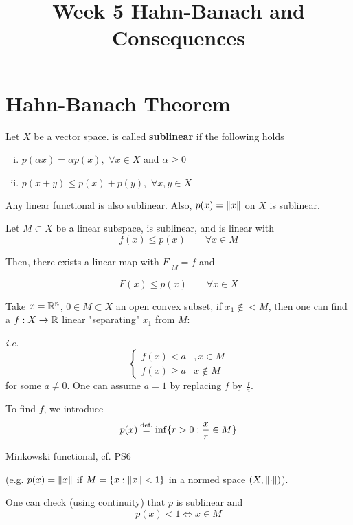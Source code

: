 \documentclass{article}
\title{Week 5 Hahn-Banach and Consequences}
\begin{document}
\maketitle

\section{Hahn-Banach Theorem} 

\begin{definition}\nl
\label{sublinear map}
	Let $X$ be a vector space.  is called \textbf{sublinear} if the following holds
	\begin{enumerate}[i)]
		\item $p( \alpha x)= \alpha p(x),$ $\forall x\in X$ and $\alpha\geq0$
		\item $p(x+y) \leq p(x)+p(y),\,\,\forall x,y\in X$
	\end{enumerate}
\end{definition}

\begin{example}
    Any linear functional is also sublinear. Also, $p(x)=\left\|{x}\right\|$ on $X$ is sublinear.
\end{example}  

\begin{theorem}\nl
\label{Hahn-Banach}
	Let $M\subset X$ be a linear subspace,  is sublinear, and  is linear with 
	\begin{equation*}
	    f(x)\leq p(x) \qquad \forall x\in M
     \tag{$*$}
	\end{equation*}

	Then, there exists a linear map  with $F|_M=f$ and
	
	$$F(x)\leq p(x) \qquad \forall x\in X$$
\end{theorem}

\begin{remark}
    Take $x=\mathbb{R}^n$, $0 \in M \subset X$ an open convex subset, if $x_1 \notin <M$, then one can find a $f: X \to \mathbb{R}$ linear "separating" $x_1$ from $M$:

    \textit{i.e.} $$
    \begin{cases}
        f(x) < a & , x\in M \\
        f(x) \geq a & x \notin M
    \end{cases}
    $$
    for some $a\neq 0$. One can assume $a=1$ by replacing $f$ by $\frac{f}{a}$.  

    To find $f$, we introduce  
    $$
    p(x) \stackrel{\text{def.}}{=} \inf \{r > 0: \frac{x}{r} \in M\}
    $$
    \begin{unexaminable}
        Minkowski functional, cf. PS6
    \end{unexaminable}
    (e.g. $p(x)=\left\|{x}\right\|$ if $M=\{x: \left\|{x}\right\|<1\}$ in a normed space $(X, \left\|{\cdot}\right\|)$).

    One can check (using continuity) that $p$ is sublinear and  
    $$
    p(x) < 1 \iff x \in M
    $$
    
\end{remark}
\end{document}
